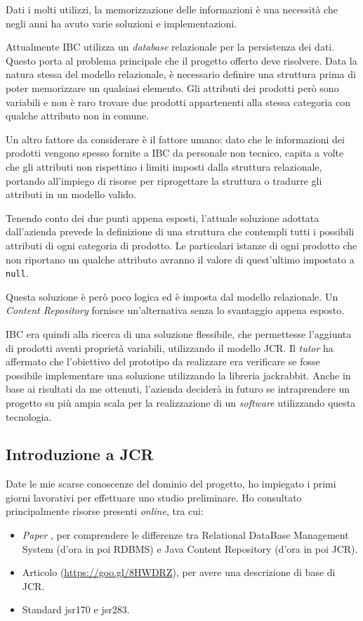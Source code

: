 		Dati i molti utilizzi, la memorizzazione delle informazioni è una necessità che negli anni ha avuto varie soluzioni e implementazioni.
						
		Attualmente IBC utilizza un \textit{database} relazionale per la persistenza dei dati. Questo porta al problema principale che il progetto offerto deve risolvere. Data la natura stessa del modello relazionale, è necessario definire una struttura prima di poter memorizzare un qualsiasi elemento. Gli attributi dei prodotti però sono variabili e non è raro trovare due prodotti appartenenti alla stessa categoria con qualche attributo non in comune.
		
		Un altro fattore da considerare è il fattore umano: dato che le informazioni dei prodotti vengono spesso fornite a IBC da personale non tecnico, capita a volte che gli attributi non rispettino i limiti imposti dalla struttura relazionale, portando all'impiego di risorse per riprogettare la struttura o tradurre gli attributi in un modello valido.
		
		Tenendo conto dei due punti appena esposti, l'attuale soluzione adottata dall'azienda prevede la definizione di una struttura che contempli tutti i possibili attributi di ogni categoria di prodotto. Le particolari istanze di ogni prodotto che non riportano un qualche attributo avranno il valore di quest'ultimo impostato a \texttt{null}.
		
		Questa soluzione è però poco logica ed è imposta dal modello relazionale. Un \textit{Content Repository} fornisce un'alternativa senza lo svantaggio appena esposto.
		
		IBC era quindi alla ricerca di una soluzione flessibile, che permettesse l'aggiunta di prodotti aventi proprietà variabili, utilizzando il modello JCR. Il \textit{tutor} ha affermato che l'obiettivo del prototipo da realizzare era verificare se fosse possibile implementare una soluzione utilizzando la libreria \gls{jackrabbit}. Anche in base ai risultati da me ottenuti, l'azienda deciderà in futuro se intraprendere un progetto su più ampia scala per la realizzazione di un \textit{software} utilizzando questa tecnologia.
		
		
		\subsection{Introduzione a JCR}
		Date le mie scarse conoscenze del dominio del progetto, ho impiegato i primi giorni lavorativi per effettuare uno studio preliminare. Ho consultato principalmente risorse presenti \textit{online}, tra cui:
		\begin{itemize}
			\item \textit{Paper} , per comprendere le differenze tra Relational DataBase Management System (d'ora in poi RDBMS) e Java Content Repository (d'ora in poi JCR).
			\item Articolo  (\url{https://goo.gl/8HWDRZ}), per avere una descrizione di base di JCR.
			\item Standard \gls{jsr170} e \gls{jsr283}.
		\end{itemize}
		
